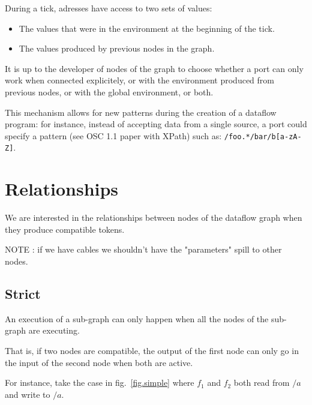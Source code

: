 \documentclass{article}
\begin{document}
    During a tick, adresses have access to two sets of values: 
    \begin{itemize}
        \item The values that were in the environment at the beginning of the tick.
        \item The values produced by previous nodes in the graph.
    \end{itemize}

    It is up to the developer of nodes of the graph to choose whether a port can only work when connected explicitely, or with the environment produced from previous nodes, or with the global environment, or both.

    This mechanism allows for new patterns during the creation of a dataflow program: for instance, instead of accepting data from a single source, a port could specify a pattern (see OSC 1.1 paper with XPath) such as: \lstinline|/foo.*/bar/b[a-zA-Z]|. 
	
	
    
	\section{Relationships}
    We are interested in the relationships between nodes of the dataflow graph when they produce compatible tokens.
     
     NOTE : if we have cables  we shouldn't have the "parameters" spill to other nodes. 
    \subsection{Strict}
    An execution of a sub-graph can only happen when all the nodes of the sub-graph are executing.
    
    That is, if two nodes are compatible, the output of the first node can only go in the input of the second node when both are active.
    
    For instance, take the case in fig.~\ref{fig.simple} where $f_1$ and $f_2$ both read from $/a$ and write to $/a$.
    
\end{document}
